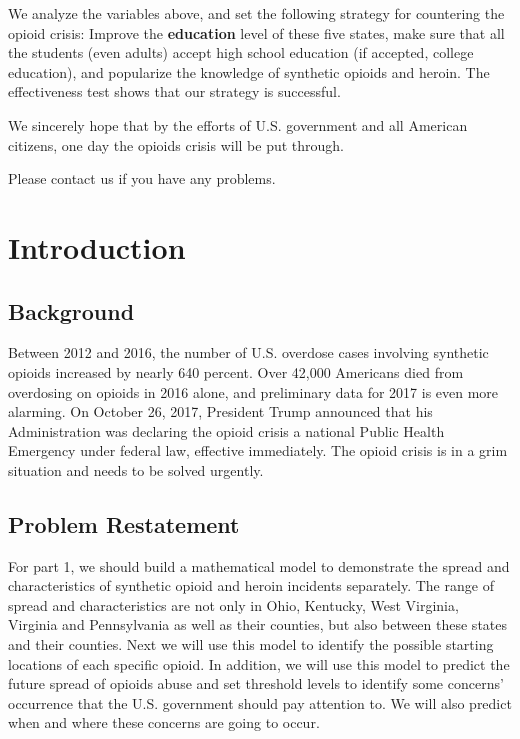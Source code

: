 \documentclass{mcmthesis}
\numberwithin{equation}{section}
\numberwithin{figure}{section}
\numberwithin{table}{section}
\theoremstyle{mydef}
\begin{document}
We analyze the variables above, and set the following strategy for countering the opioid crisis: Improve the {\bf{education}} level of these five states, make sure that all the students (even adults) accept high school education (if accepted, college education), and popularize the knowledge of synthetic opioids and heroin. The effectiveness test shows that our strategy is successful.

We sincerely hope that by the efforts of U.S. government and all American citizens, one day the opioids crisis will be put through.

Please contact us if you have any problems.

\newpage
\section{Introduction}
\subsection{Background}

Between 2012 and 2016, the number of U.S. overdose cases involving synthetic opioids increased by nearly 640 percent. Over 42,000 Americans died from overdosing on opioids in 2016 alone, and preliminary data for 2017 is even more alarming\cite{bib:one}. On October 26, 2017, President Trump announced that his Administration was declaring the opioid crisis a national Public Health Emergency under federal law, effective immediately. The opioid crisis is in a grim situation and needs to be solved urgently.

\subsection{Problem Restatement}

For part 1, we should build a mathematical model to demonstrate the spread and characteristics of synthetic opioid and heroin incidents separately. The range of spread and characteristics are not only in Ohio, Kentucky, West Virginia, Virginia and Pennsylvania as well as their counties, but also between these states and their counties. Next we will use this model to identify the possible starting locations of each specific opioid. In addition, we will use this model to predict the future spread of opioids abuse and set threshold levels to identify some concerns' occurrence that the U.S. government should pay attention to. We will also predict when and where these concerns are going to occur.
\end{document}
